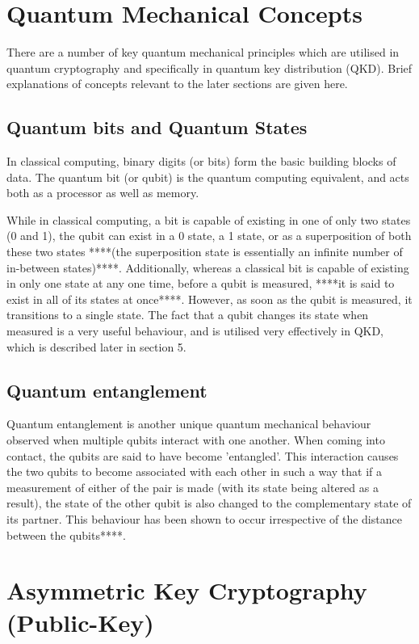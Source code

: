 \documentclass[runningheads,a4paper]{llncs}
\begin{document}
\section{Quantum Mechanical Concepts}

There are a number of key quantum mechanical principles which are utilised in quantum cryptography and specifically in quantum key distribution (QKD). Brief explanations of concepts relevant to the later sections are given here.

\subsection{Quantum bits and Quantum States}

In classical computing, binary digits (or bits) form the basic building blocks of data. The quantum bit (or qubit) is the quantum computing equivalent, and acts both as a processor as well as memory. 

While in classical computing, a bit is capable of existing in one of only two states (0 and 1), the qubit can exist in a 0 state, a 1 state, or as a superposition of both these two states ****(the superposition state is essentially an infinite number of in-between states)****. Additionally, whereas a classical bit is capable of existing in only one state at any one time, before a qubit is measured, ****it is said to exist in all of its states at once****. However, as soon as the qubit is measured, it transitions to a single state. The fact that a qubit changes its state when measured is a very useful behaviour, and is utilised very effectively in QKD, which is described later in section 5.

\subsection{Quantum entanglement}

Quantum entanglement is another unique quantum mechanical behaviour observed when multiple qubits interact with one another. When coming into contact, the qubits are said to have become 'entangled'. This interaction causes the two qubits to become associated with each other in such a way that if a measurement of either of the pair is made (with its state being altered as a result), the state of the other qubit is also changed to the complementary state of its partner. This behaviour has been shown to occur irrespective of the distance between the qubits****.

\section{Asymmetric Key Cryptography (Public-Key)} 
\end{document}
